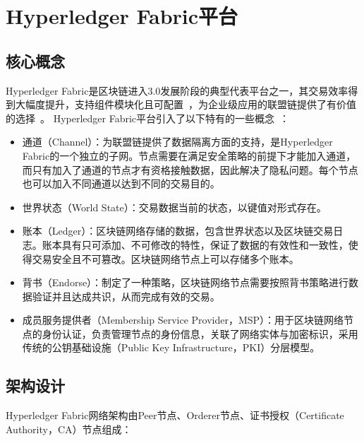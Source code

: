 \section{Hyperledger Fabric平台}

\subsection{核心概念}

Hyperledger Fabric是区块链进入3.0发展阶段的典型代表平台之一，其交易效率得到大幅度提升，支持组件模块化且可配置~\cite{DBLP:conf/eurosys/AndroulakiBBCCC18}，为企业级应用的联盟链提供了有价值的选择~\cite{DBLP:conf/isads/XuZZP17}。
Hyperledger Fabric平台引入了以下特有的一些概念~\cite{NingDong}：

\begin{itemize}
    \item 通道（Channel）：为联盟链提供了数据隔离方面的支持，是Hyperledger Fabric的一个独立的子网。节点需要在满足安全策略的前提下才能加入通道，而只有加入了通道的节点才有资格接触数据，因此解决了隐私问题。每个节点也可以加入不同通道以达到不同的交易目的。
    \item 世界状态（World State）：交易数据当前的状态，以键值对形式存在。
    \item 账本（Ledger）：区块链网络存储的数据，包含世界状态以及区块链交易日志。账本具有只可添加、不可修改的特性，保证了数据的有效性和一致性，使得交易安全且不可篡改。区块链网络节点上可以存储多个账本。
    \item 背书（Endorse）：制定了一种策略，区块链网络节点需要按照背书策略进行数据验证并且达成共识，从而完成有效的交易。
    \item 成员服务提供者（Membership Service Provider，MSP）：用于区块链网络节点的身份认证，负责管理节点的身份信息，关联了网络实体与加密标识，采用传统的公钥基础设施（Public Key Infrastructure，PKI）分层模型。
\end{itemize}

\subsection{架构设计}

Hyperledger Fabric网络架构由Peer节点、Orderer节点、证书授权（Certificate Authority，CA）节点组成：

